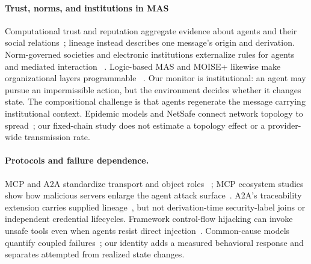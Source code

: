 \paragraph{Trust, norms, and institutions in MAS}
Computational trust and reputation aggregate evidence about agents and their
social relations~\cite{sabater2005trust}; lineage instead describes one
message's origin and derivation. Norm-governed societies and electronic
institutions externalize rules for agents and mediated interaction
~\cite{artikis2009norms,esteva2004ameli}. Logic-based MAS and MOISE+ likewise
make organizational layers programmable
~\cite{calegari2021logic,hubner2007moise}. Our monitor is institutional: an
agent may pursue an impermissible action, but the environment decides whether
it changes state. The compositional challenge is that agents regenerate the
message carrying institutional context. Epidemic models and NetSafe connect
network topology to spread~\cite{pastor2001epidemic,yu2025netsafe}; our
fixed-chain study does not estimate a topology effect or a provider-wide
transmission rate.

\paragraph{Protocols and failure dependence.}
MCP and A2A standardize transport and object roles
~\cite{mcp-spec-2025,a2a-spec-2025}; MCP ecosystem studies show how malicious
servers enlarge the agent attack surface~\cite{song2025beyond}. A2A's
traceability extension carries supplied lineage~\cite{a2a-traceability-2026},
but not derivation-time security-label joins or independent credential
lifecycles. Framework control-flow hijacking can invoke unsafe tools even
when agents resist direct injection~\cite{triedman2025malicious}. Common-cause
models quantify coupled failures~\cite{fleming1975reliability}; our identity
adds a measured behavioral response and separates attempted from realized
state changes.

